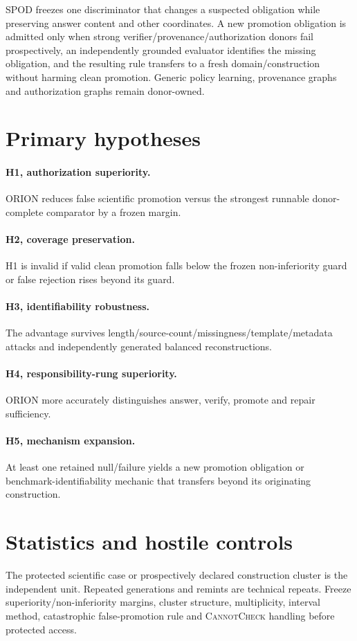 \documentclass[11pt]{article}
\begin{document}
SPOD freezes one discriminator that changes a suspected obligation while preserving answer content and other coordinates. A new promotion obligation is admitted only when strong verifier/provenance/authorization donors fail prospectively, an independently grounded evaluator identifies the missing obligation, and the resulting rule transfers to a fresh domain/construction without harming clean promotion. Generic policy learning, provenance graphs and authorization graphs remain donor-owned.

\section{Primary hypotheses}
\paragraph{H1, authorization superiority.} ORION reduces false scientific promotion versus the strongest runnable donor-complete comparator by a frozen margin.

\paragraph{H2, coverage preservation.} H1 is invalid if valid clean promotion falls below the frozen non-inferiority guard or false rejection rises beyond its guard.

\paragraph{H3, identifiability robustness.} The advantage survives length/source-count/missingness/template/metadata attacks and independently generated balanced reconstructions.

\paragraph{H4, responsibility-rung superiority.} ORION more accurately distinguishes answer, verify, promote and repair sufficiency.

\paragraph{H5, mechanism expansion.} At least one retained null/failure yields a new promotion obligation or benchmark-identifiability mechanic that transfers beyond its originating construction.

\section{Statistics and hostile controls}
The protected scientific case or prospectively declared construction cluster is the independent unit. Repeated generations and remints are technical repeats. Freeze superiority/non-inferiority margins, cluster structure, multiplicity, interval method, catastrophic false-promotion rule and \textsc{CannotCheck} handling before protected access.
\end{document}
